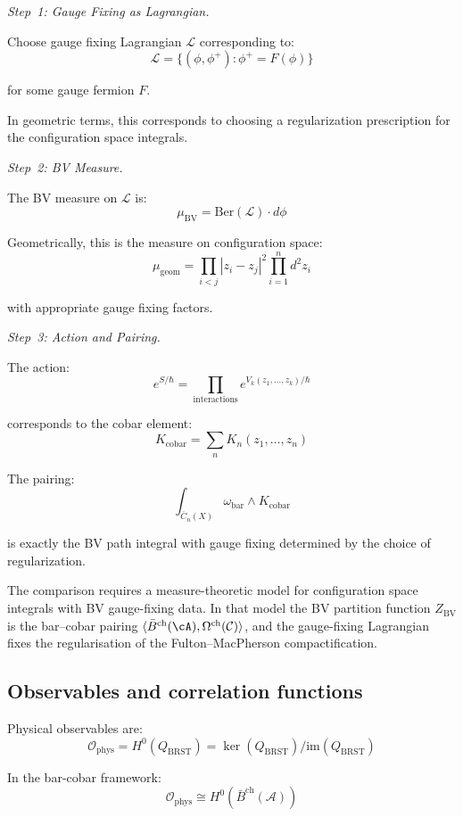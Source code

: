 \begin{evidence}
\emph{Step~1: Gauge Fixing as Lagrangian.}

Choose gauge fixing Lagrangian $\mathcal{L}$ corresponding to:
\[\mathcal{L} = \{(\phi, \phi^+) : \phi^+ = F(\phi)\}\]

for some gauge fermion $F$.

In geometric terms, this corresponds to choosing a regularization prescription
for the configuration space integrals.

\emph{Step~2: BV Measure.}

The BV measure on $\mathcal{L}$ is:
\[\mu_{\text{BV}} = \text{Ber}(\mathcal{L}) \cdot d\phi\]

Geometrically, this is the measure on configuration space:
\[\mu_{\text{geom}} = \prod_{i<j} |z_i - z_j|^2 \prod_{i=1}^n d^2z_i\]

with appropriate gauge fixing factors.

\emph{Step~3: Action and Pairing.}

The action:
\[e^{S/\hbar} = \prod_{\text{interactions}} e^{V_k(z_1, \ldots, z_k)/\hbar}\]

corresponds to the cobar element:
\[K_{\text{cobar}} = \sum_n K_n(z_1, \ldots, z_n)\]

The pairing:
\[\int_{\overline{C}_n(X)} \omega_{\text{bar}} \wedge K_{\text{cobar}}\]

is exactly the BV path integral with gauge fixing determined by the choice of
regularization.
\end{evidence}

\begin{remark}
The comparison requires a measure-theoretic model for configuration
space integrals with BV gauge-fixing data. In that model the BV
partition function $Z_{\mathrm{BV}}$ is the bar--cobar pairing
$\langle \bar{B}^{\mathrm{ch}}(\cA),\Omega^{\mathrm{ch}}(\mathcal C)\rangle$,
and the gauge-fixing Lagrangian fixes the regularisation of the
Fulton--MacPherson compactification.
\end{remark}

\subsection{Observables and correlation functions}

\begin{theorem}
Physical observables are:
\[\mathcal{O}_{\text{phys}} = H^0(Q_{\text{BRST}}) =
\ker(Q_{\text{BRST}})/\text{im}(Q_{\text{BRST}})\]

In the bar-cobar framework:
\[\mathcal{O}_{\text{phys}} \cong H^0(\bar{B}^{\text{ch}}(\mathcal{A}))\]
\end{theorem}


